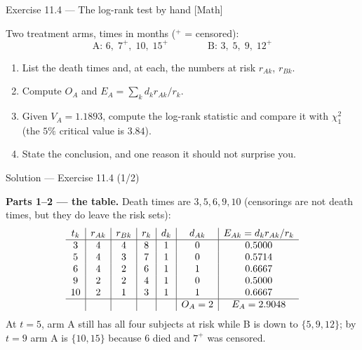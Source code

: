 \documentclass[aspectratio=169,11pt]{beamer}
\begin{document}
\begin{frame}{Exercise 11.4 --- The log-rank test by hand [Math]}
\begin{exercise}
  Two treatment arms, times in months ($^{+}$ = censored):
  \[
    \text{A: } 6,\; 7^{+},\; 10,\; 15^{+}
    \qquad\qquad
    \text{B: } 3,\; 5,\; 9,\; 12^{+}
  \]
  \begin{enumerate}
    \item List the death times and, at each, the numbers at risk $r_{Ak}$, $r_{Bk}$.
    \item Compute $O_A$ and $E_A=\sum_k d_k r_{Ak}/r_k$.
    \item Given $V_A=1.1893$, compute the log-rank statistic and compare it with
          $\chi^2_1$ (the $5\%$ critical value is $3.84$).
    \item State the conclusion, and one reason it should not surprise you.
  \end{enumerate}
\end{exercise}
\end{frame}

\begin{frame}{Solution --- Exercise 11.4 (1/2)}
  \scriptsize
\begin{solutionbox}
  \tiny
  \textbf{Parts 1--2 --- the table.} Death times are $3,5,6,9,10$ (censorings are not
  death times, but they do leave the risk sets):
  \[
    \begin{array}{c|c|c|c|c|c|c}
      t_k & r_{Ak} & r_{Bk} & r_k & d_k & d_{Ak} & E_{Ak}=d_k r_{Ak}/r_k\\ \hline
      3  & 4 & 4 & 8 & 1 & 0 & 0.5000\\
      5  & 4 & 3 & 7 & 1 & 0 & 0.5714\\
      6  & 4 & 2 & 6 & 1 & 1 & 0.6667\\
      9  & 2 & 2 & 4 & 1 & 0 & 0.5000\\
      10 & 2 & 1 & 3 & 1 & 1 & 0.6667\\ \hline
         &   &   &   &   & O_A=2 & E_A=2.9048
    \end{array}
  \]
  At $t=5$, arm A still has all four subjects at risk while B is down to $\{5,9,12\}$;
  by $t=9$ arm A is $\{10,15\}$ because $6$ died and $7^{+}$ was censored.
\end{solutionbox}
\end{frame}
\end{document}
